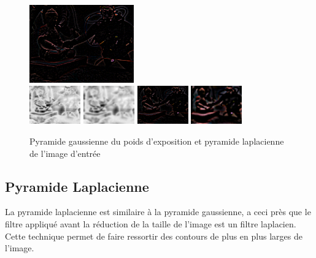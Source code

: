\documentclass[twoside]{article}
\begin{document}
\begin{figure}
  \includegraphics[width=0.4\textwidth]{Support/laplacian2.png}\\
  \vspace{0.1cm}
  \includegraphics[width=0.196\textwidth]{Support/gaussian3.png}
  \includegraphics[width=0.196\textwidth]{Support/gaussian4.png}
  \vspace{0.1cm}
  \includegraphics[width=0.196\textwidth]{Support/laplacian3.png}
  \includegraphics[width=0.196\textwidth]{Support/laplacian4.png}

  \caption{Pyramide gaussienne du poids d'exposition et pyramide laplacienne de l'image d'entrée}
\end{figure}


\subsection{Pyramide Laplacienne}
La pyramide laplacienne est similaire à la pyramide gaussienne, a ceci près que le filtre appliqué avant la réduction de la taille de l'image est un filtre laplacien. Cette technique permet de faire ressortir des contours de plus en plus larges de l'image.
\end{document}
